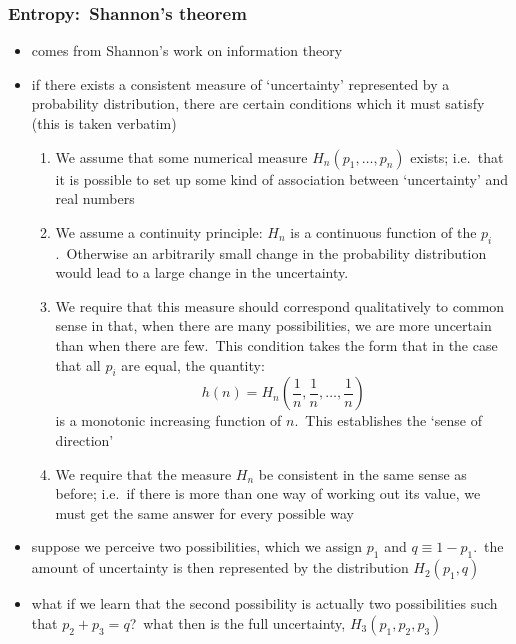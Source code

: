 \documentclass[../jaynes_prob_theory_notes.tex]{subfiles}
\begin{document}
            \subsubsection{Entropy:\ Shannon's theorem}
                \begin{itemize}
                    \item comes from Shannon's work on information theory
                    \item if there exists a consistent measure of `uncertainty' represented by a probability distribution, there are certain conditions which it must satisfy (this is taken verbatim)
                        \begin{enumerate}
                            \item We assume that some numerical measure $H_n (p_1, \ldots, p_n)$ exists; i.e.\ that it is possible to set up some kind of association between `uncertainty' and real numbers
                            \item We assume a continuity principle: $H_n$ is a continuous function of the $p_i$.\ Otherwise an arbitrarily small change in the probability distribution would lead to a large change in the uncertainty.
                            \item We require that this measure should correspond qualitatively to common sense in that, when there are many possibilities, we are more uncertain than when there are few.\ This condition takes the form that in the case that all $p_i$ are equal, the quantity:
                                \begin{equation*} 
                                    h(n) = H_n \left( \frac{1}{n}, \frac{1}{n}, \ldots, \frac{1}{n} \right)
                                \end{equation*}
                                is a monotonic increasing function of $n$.\ This establishes the `sense of direction'
                            \item We require that the measure $H_n$ be consistent in the same sense as before; i.e.\ if there is more than one way of working out its value, we must get the same answer for every possible way
                        \end{enumerate}
                    \item suppose we perceive two possibilities, which we assign $p_1$ and $q \equiv 1 - p_1$.\ the amount of uncertainty is then represented by the distribution $H_2 (p_1 , q)$
                    \item what if we learn that the second possibility is actually two possibilities such that $p_2 + p_3 = q$?\ what then is the full uncertainty, $H_3 (p_1, p_2, p_3)$

\end{itemize}
\end{document}
